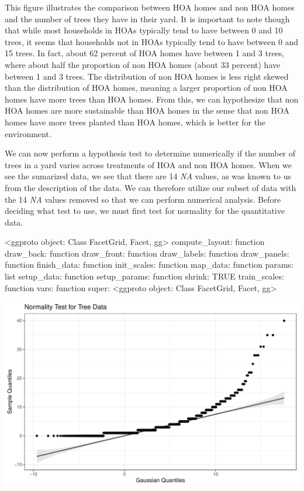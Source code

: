 \documentclass{article}
\begin{document}
This figure illustrates the comparison between HOA homes and non HOA homes and the number of trees they have in their yard. It is important to note though that while most households in HOAs typically tend to have between 0 and 10 trees, it seems that households not in HOAs typically tend to have between 0 and 15 trees. In fact, about 62 percent of HOA homes have between 1 and 3 trees, where about half the proportion of non HOA homes (about 33 percent) have between 1 and 3 trees. The distribution of non HOA homes is less right skewed than the distribution of HOA homes, meaning a larger proportion of non HOA homes have more trees than HOA homes. From this, we can hypothesize that non HOA homes are more sustainable than HOA homes in the sense that non HOA homes have more trees planted than HOA homes, which is better for the environment.

We can now perform a hypothesis test to determine numerically if the number of trees in a yard varies across treatments of HOA and non HOA homes. When we see the sumarized data, we see that there are 14 \textit{NA} values, as was known to us from the description of the data. We can therefore utilize our subset of data with the 14 \textit{NA} values removed so that we can perform numerical analysis. Before deciding what test to use, we must first test for normality for the quantitative data.
\newline
\begin{Schunk}
\begin{Soutput}
<ggproto object: Class FacetGrid, Facet, gg>
    compute_layout: function
    draw_back: function
    draw_front: function
    draw_labels: function
    draw_panels: function
    finish_data: function
    init_scales: function
    map_data: function
    params: list
    setup_data: function
    setup_params: function
    shrink: TRUE
    train_scales: function
    vars: function
    super:  <ggproto object: Class FacetGrid, Facet, gg>
\end{Soutput}
\end{Schunk}
\includegraphics{exam22-019}
\end{document}
